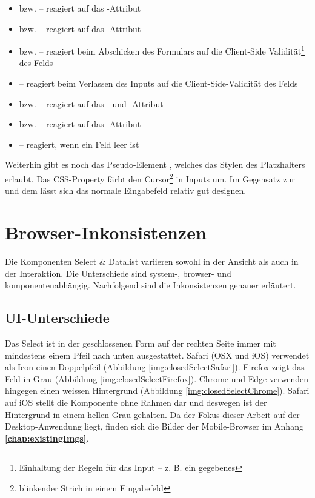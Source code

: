 \begin{itemize}
    \item {} bzw.  – reagiert auf das -Attribut
    \item {} bzw.  – reagiert auf das -Attribut
    \item {} bzw.  – reagiert beim Abschicken des Formulars auf die Client-Side Validität\footnote{
            Einhaltung der Regeln für das Input – z. B. ein gegebenes 
        } des Felds
    \item {} – reagiert beim Verlassen des Inputs auf die Client-Side-Validität des Felds
    \item {} bzw.  – reagiert auf das - und -Attribut
    \item {} bzw.  – reagiert auf das -Attribut
    \item {} – reagiert, wenn ein Feld leer ist
\end{itemize}

Weiterhin gibt es noch das Pseudo-Element , welches das Stylen des Platzhalters erlaubt. 
Das CSS-Property  färbt den Cursor\footnote{
    blinkender Strich in einem Eingabefeld
} in Inputs um. 
Im Gegensatz zur  und dem  lässt sich das normale Eingabefeld relativ gut designen. 


\clearpage
\section{Browser-Inkonsistenzen}
\label{sec:browserInconsistency}

Die Komponenten Select \& Datalist variieren sowohl in der Ansicht als auch in der Interaktion. 
Die Unterschiede sind system-, browser- und komponentenabhängig.
Nachfolgend sind die Inkonsistenzen genauer erläutert. 


\subsection{UI-Unterschiede}
\label{sec:uiDifferences}

Das Select ist in der geschlossenen Form auf der rechten Seite immer mit mindestens einem Pfeil nach unten ausgestattet. 
Safari (OSX und iOS) verwendet als Icon einen Doppelpfeil (Abbildung \ref{img:closedSelectSafari}). 
Firefox zeigt das Feld in Grau (Abbildung \ref{img:closedSelectFirefox}). 
Chrome und Edge verwenden hingegen einen weissen Hintergrund (Abbildung \ref{img:closedSelectChrome}). 
Safari auf iOS stellt die Komponente ohne Rahmen dar und deswegen ist der Hintergrund in einem hellen Grau gehalten. 
Da der Fokus dieser Arbeit auf der Desktop-Anwendung liegt, finden sich die Bilder der Mobile-Browser im Anhang \textbf{\ref{chap:existingImgs}}. 

